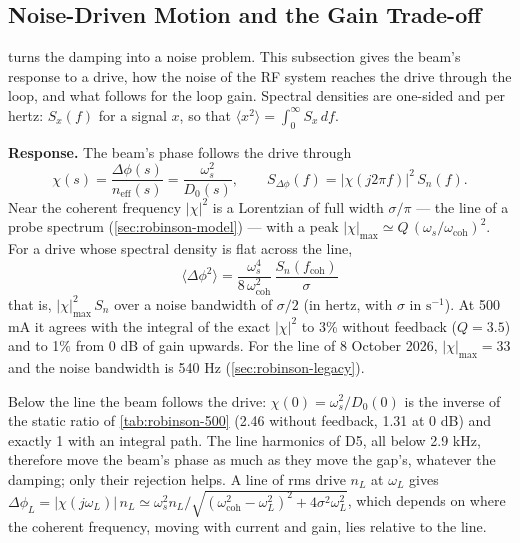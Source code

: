 \subsection{Noise-Driven Motion and the Gain Trade-off}\label{sec:robinson-noise}

 turns the damping into a noise problem. This subsection gives the beam's response to a drive, how the noise of the RF system reaches the drive through the loop, and what follows for the loop gain. Spectral densities are one-sided and per hertz: \(S_x(f)\) for a signal \(x\), so that \(\langle x^2\rangle = \int_0^\infty S_x\,df\).

\textbf{Response.} The beam's phase follows the drive through
\begin{equation}\label{eq:rob-response}
\chi(s) = \frac{\Delta\phi(s)}{n_\text{eff}(s)} = \frac{\omega_s^2}{D_0(s)},
\qquad
S_{\Delta\phi}(f) = \lvert\chi(j2\pi f)\rvert^2\,S_n(f).
\end{equation}
Near the coherent frequency \(\lvert\chi\rvert^2\) is a Lorentzian of full width \(\sigma/\pi\) --- the line of a probe spectrum (\cref{sec:robinson-model}) --- with a peak \(\lvert\chi\rvert_\text{max} \simeq Q\,(\omega_s/\omega_\text{coh})^2\). For a drive whose spectral density is flat across the line,
\begin{equation}\label{eq:rob-var}
\boxed{\langle\Delta\phi^2\rangle = \frac{\omega_s^4}{8\,\omega_\text{coh}^2}\,\frac{S_n(f_\text{coh})}{\sigma}}
\end{equation}
that is, \(\lvert\chi\rvert_\text{max}^2\,S_n\) over a noise bandwidth of \(\sigma/2\) (in hertz, with \(\sigma\) in \(\text{s}^{-1}\)). At 500 mA it agrees with the integral of the exact \(\lvert\chi\rvert^2\) to 3\% without feedback (\(Q = 3.5\)) and to 1\% from 0 dB of gain upwards. For the line of 8 October 2026, \(\lvert\chi\rvert_\text{max} = 33\) and the noise bandwidth is 540 Hz (\cref{sec:robinson-legacy}).

Below the line the beam follows the drive: \(\chi(0) = \omega_s^2/D_0(0)\) is the inverse of the static ratio of \cref{tab:robinson-500} (2.46 without feedback, 1.31 at 0 dB) and exactly 1 with an integral path. The line harmonics of D5, all below 2.9 kHz, therefore move the beam's phase as much as they move the gap's, whatever the damping; only their rejection helps. A line of rms drive \(n_L\) at \(\omega_L\) gives \(\Delta\phi_L = \lvert\chi(j\omega_L)\rvert\,n_L \simeq \omega_s^2 n_L/\sqrt{(\omega_\text{coh}^2 - \omega_L^2)^2 + 4\sigma^2\omega_L^2}\), which depends on where the coherent frequency, moving with current and gain, lies relative to the line.

